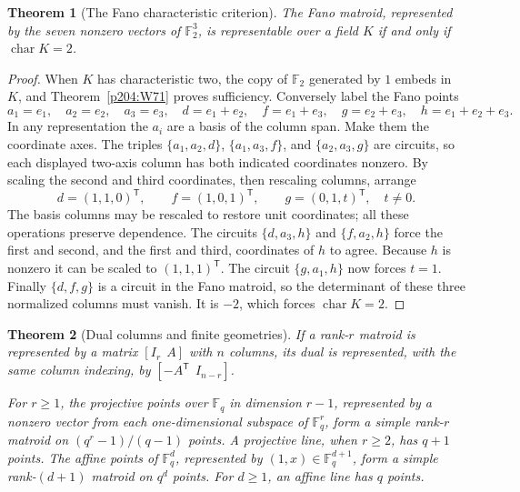 \documentclass[11pt,oneside,openany]{book}
\theoremstyle{plain}
\newtheorem{theorem}{Theorem}[chapter]
\theoremstyle{definition}
\theoremstyle{remark}
\begin{document}
\begin{theorem}[The Fano characteristic criterion]
\label{p204:W74}
The Fano matroid, represented by the seven nonzero vectors
of \(\mathbb F_2^3\), is representable over a field \(K\)
if and only if \(\operatorname{char}K=2\).
\end{theorem}

\begin{proof}
When \(K\) has characteristic two, the copy of \(\mathbb F_2\)
generated by \(1\) embeds in \(K\), and
Theorem~\ref{p204:W71} proves sufficiency. Conversely label the
Fano points
\[
 a_1=e_1,\quad a_2=e_2,\quad a_3=e_3,\quad
 d=e_1+e_2,\quad f=e_1+e_3,\quad
 g=e_2+e_3,\quad h=e_1+e_2+e_3.
\]
In any representation the \(a_i\) are a basis of the column
span. Make them the coordinate axes. The triples
\(\{a_1,a_2,d\}\), \(\{a_1,a_3,f\}\),
and \(\{a_2,a_3,g\}\) are circuits, so each displayed
two-axis column has both indicated coordinates nonzero.
By scaling the second and third coordinates, then rescaling
columns, arrange
\[
 d=(1,1,0)^{\mathsf T},\qquad f=(1,0,1)^{\mathsf T},
 \qquad g=(0,1,t)^{\mathsf T},\quad t\ne0 .
\]
The basis columns may be rescaled to restore unit coordinates;
all these operations preserve dependence. The circuits
\(\{d,a_3,h\}\) and \(\{f,a_2,h\}\) force the first and
second, and the first and third, coordinates of \(h\)
to agree. Because \(h\) is nonzero it can be scaled to
\((1,1,1)^{\mathsf T}\). The circuit \(\{g,a_1,h\}\) now
forces \(t=1\). Finally \(\{d,f,g\}\) is a circuit in the
Fano matroid, so the determinant of these three normalized
columns must vanish. It is \(-2\), which forces
\(\operatorname{char}K=2\).
\end{proof}

\begin{theorem}[Dual columns and finite geometries]
\label{p204:W75}
If a rank-\(r\) matroid is represented by a matrix
\([I_r\ \ A]\) with \(n\) columns, its dual is represented,
with the same column indexing, by
\([-A^{\mathsf T}\ \ I_{n-r}]\).

For \(r\geq 1\), the projective points over \(\mathbb F_q\) in
dimension \(r-1\), represented by a nonzero vector from each
one-dimensional subspace of \(\mathbb F_q^r\), form a simple
rank-\(r\) matroid on \((q^r-1)/(q-1)\) points.
A projective line, when \(r\ge2\), has \(q+1\) points.
The affine points of \(\mathbb F_q^d\), represented by
\((1,x)\in\mathbb F_q^{d+1}\), form a simple rank-\((d+1)\)
matroid on \(q^d\) points. For \(d\ge1\), an affine line
has \(q\) points.
\end{theorem}
\end{document}
